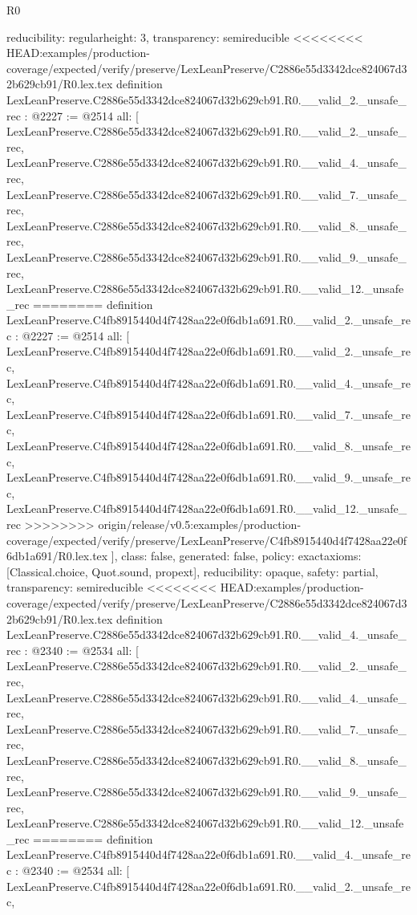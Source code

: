 \begin{lexlean}{R0}
\begin{coremodule}
{{{{{{{{{{{{{{{{{{{{{{{{{{{{{{{{{{{{{{{{{{{{{{{{{{  reducibility: regular{height: 3},
  transparency: semireducible
}
<<<<<<<< HEAD:examples/production-coverage/expected/verify/preserve/LexLeanPreserve/C2886e55d3342dce824067d32b629cb91/R0.lex.tex
definition LexLeanPreserve.C2886e55d3342dce824067d32b629cb91.R0.__valid_2._unsafe_rec : @2227 := @2514 {
  all: [
    LexLeanPreserve.C2886e55d3342dce824067d32b629cb91.R0.__valid_2._unsafe_rec,
    LexLeanPreserve.C2886e55d3342dce824067d32b629cb91.R0.__valid_4._unsafe_rec,
    LexLeanPreserve.C2886e55d3342dce824067d32b629cb91.R0.__valid_7._unsafe_rec,
    LexLeanPreserve.C2886e55d3342dce824067d32b629cb91.R0.__valid_8._unsafe_rec,
    LexLeanPreserve.C2886e55d3342dce824067d32b629cb91.R0.__valid_9._unsafe_rec,
    LexLeanPreserve.C2886e55d3342dce824067d32b629cb91.R0.__valid_12._unsafe_rec
========
definition LexLeanPreserve.C4fb8915440d4f7428aa22e0f6db1a691.R0.__valid_2._unsafe_rec : @2227 := @2514 {
  all: [
    LexLeanPreserve.C4fb8915440d4f7428aa22e0f6db1a691.R0.__valid_2._unsafe_rec,
    LexLeanPreserve.C4fb8915440d4f7428aa22e0f6db1a691.R0.__valid_4._unsafe_rec,
    LexLeanPreserve.C4fb8915440d4f7428aa22e0f6db1a691.R0.__valid_7._unsafe_rec,
    LexLeanPreserve.C4fb8915440d4f7428aa22e0f6db1a691.R0.__valid_8._unsafe_rec,
    LexLeanPreserve.C4fb8915440d4f7428aa22e0f6db1a691.R0.__valid_9._unsafe_rec,
    LexLeanPreserve.C4fb8915440d4f7428aa22e0f6db1a691.R0.__valid_12._unsafe_rec
>>>>>>>> origin/release/v0.5:examples/production-coverage/expected/verify/preserve/LexLeanPreserve/C4fb8915440d4f7428aa22e0f6db1a691/R0.lex.tex
  ],
  class: false,
  generated: false,
  policy: exact{axioms: [Classical.choice, Quot.sound, propext]},
  reducibility: opaque{},
  safety: partial,
  transparency: semireducible
}
<<<<<<<< HEAD:examples/production-coverage/expected/verify/preserve/LexLeanPreserve/C2886e55d3342dce824067d32b629cb91/R0.lex.tex
definition LexLeanPreserve.C2886e55d3342dce824067d32b629cb91.R0.__valid_4._unsafe_rec : @2340 := @2534 {
  all: [
    LexLeanPreserve.C2886e55d3342dce824067d32b629cb91.R0.__valid_2._unsafe_rec,
    LexLeanPreserve.C2886e55d3342dce824067d32b629cb91.R0.__valid_4._unsafe_rec,
    LexLeanPreserve.C2886e55d3342dce824067d32b629cb91.R0.__valid_7._unsafe_rec,
    LexLeanPreserve.C2886e55d3342dce824067d32b629cb91.R0.__valid_8._unsafe_rec,
    LexLeanPreserve.C2886e55d3342dce824067d32b629cb91.R0.__valid_9._unsafe_rec,
    LexLeanPreserve.C2886e55d3342dce824067d32b629cb91.R0.__valid_12._unsafe_rec
========
definition LexLeanPreserve.C4fb8915440d4f7428aa22e0f6db1a691.R0.__valid_4._unsafe_rec : @2340 := @2534 {
  all: [
    LexLeanPreserve.C4fb8915440d4f7428aa22e0f6db1a691.R0.__valid_2._unsafe_rec,
}}}}}}}}}}}}}}}}}}}}}}}}}}}}}}}}}}}}}}}}}}}}}}}}}}}}
\end{coremodule}
\end{lexlean}
